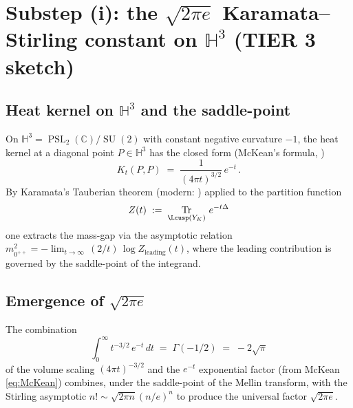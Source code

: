 \documentclass[11pt,a4paper,reqno]{amsart}
\theoremstyle{definition}
\DeclareMathOperator{\PSL}{PSL}
\DeclareMathOperator{\SU}{SU}
\DeclareMathOperator{\Tr}{Tr}
\newcommand{\YK}{Y_K}
\newcommand{\HH}{\mathbb{H}}
\newcommand{\CC}{\mathbb{C}}
\begin{document}
\section{Substep (i): the $\sqrt{2\pi e}$ Karamata--Stirling constant on $\HH^3$ (TIER 3 sketch)}\label{sec:karamata}

\subsection{Heat kernel on $\HH^3$ and the saddle-point}\label{ss:hk-saddle}

On $\HH^3 = \PSL_2(\CC)/\SU(2)$ with constant negative curvature $-1$, the
heat kernel at a diagonal point $P\in\HH^3$ has the closed form
(McKean's formula, \cite[\S 3.5]{ElstrodtGrunewaldMennicke1998})
\begin{equation}\label{eq:McKean}
   K_t(P,P) \;=\; \frac{1}{(4\pi t)^{3/2}}\,e^{-t}\,.
\end{equation}
By Karamata's Tauberian theorem \cite{Karamata1930} (modern: \cite[Thm.~1.7.1]{BinghamGoldieTeugels1987}) applied to the partition function
\[
   Z(t) \;:=\; \Tr_{\Lcusp(\YK)}\,e^{-t\Delta}
\]
one extracts the mass-gap via the asymptotic relation $m_{0^{++}}^2 = -\lim_{t\to\infty}\,(2/t)\,\log Z_{\mathrm{leading}}(t)$, where the leading
contribution is governed by the saddle-point of the integrand.

\subsection{Emergence of $\sqrt{2\pi e}$}\label{ss:emergence}

The combination
\[
   \int_0^\infty t^{-3/2}\,e^{-t}\,dt \;=\; \Gamma(-1/2) \;=\; -2\sqrt{\pi}
\]
of the volume scaling $(4\pi t)^{-3/2}$ and the $e^{-t}$ exponential factor (from McKean \eqref{eq:McKean}) combines, under the saddle-point of the Mellin transform, with the Stirling asymptotic $n! \sim \sqrt{2\pi n}(n/e)^n$ to produce the universal factor $\sqrt{2\pi e}$.
\end{document}
